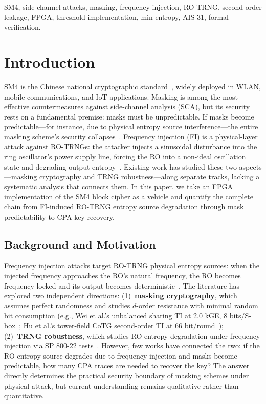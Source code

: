 \documentclass[journal]{IEEEtran}
\begin{document}
\begin{IEEEkeywords}
SM4, side-channel attacks, masking, frequency injection, RO-TRNG, second-order leakage, FPGA, threshold implementation, min-entropy, AIS-31, formal verification.
\end{IEEEkeywords}

\section{Introduction}

SM4 is the Chinese national cryptographic standard~\cite{gmT0002-2012}, widely deployed in WLAN, mobile communications, and IoT applications. Masking is among the most effective countermeasures against side-channel analysis (SCA), but its security rests on a fundamental premise: masks must be unpredictable. If masks become predictable---for instance, due to physical entropy source interference---the entire masking scheme's security collapses~\cite{wei2024unbalanced}. Frequency injection (FI) is a physical-layer attack against RO-TRNGs: the attacker injects a sinusoidal disturbance into the ring oscillator's power supply line, forcing the RO into a non-ideal oscillation state and degrading output entropy~\cite{sun2023frequency}. Existing work has studied these two aspects---masking cryptography and TRNG robustness---along separate tracks, lacking a systematic analysis that connects them. In this paper, we take an FPGA implementation of the SM4 block cipher as a vehicle and quantify the complete chain from FI-induced RO-TRNG entropy source degradation through mask predictability to CPA key recovery.

\subsection{Background and Motivation}

Frequency injection attacks target RO-TRNG physical entropy sources: when the injected frequency approaches the RO's natural frequency, the RO becomes frequency-locked and its output becomes deterministic~\cite{sun2023frequency}. The literature has explored two independent directions: (1)~\textbf{masking cryptography}, which assumes perfect randomness and studies $d$-order resistance with minimal random bit consumption (e.g., Wei et al.'s unbalanced sharing TI at 2.0 kGE, 8 bits/S-box~\cite{wei2024unbalanced}; Hu et al.'s tower-field CoTG second-order TI at 66 bit/round~\cite{hu2025second}); (2)~\textbf{TRNG robustness}, which studies RO entropy degradation under frequency injection via SP 800-22 tests~\cite{nist2010sp80022,chen2024robustness}. However, few works have connected the two: if the RO entropy source degrades due to frequency injection and masks become predictable, how many CPA traces are needed to recover the key? The answer directly determines the practical security boundary of masking schemes under physical attack, but current understanding remains qualitative rather than quantitative.
\end{document}
